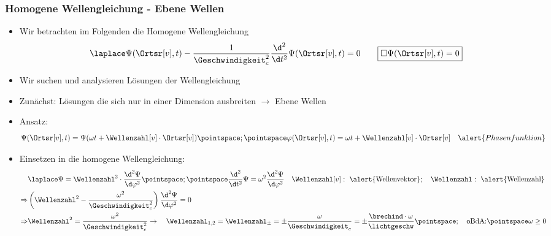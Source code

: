 \begin{frame}
  \frametitle{Homogene Wellengleichung - Ebene Wellen}
  \begin{itemize}[<+->]
\item Wir betrachten im Folgenden die \alert{Homogene Wellengleichung}
    \begin{equation*}
\laplace\Psi (\Ortsr[v], t) - \frac{1}{\Geschwindigkeit_{c}^2}\frac{\d ^2}{\d t^2}\Psi (\Ortsr[v], t) = 0 \qquad \boxed{\square \Psi (\Ortsr[v], t) = 0} 
\end{equation*}
\item Wir suchen und analysieren Lösungen der Wellengleichung
\item Zunächst: Lösungen die sich nur in \alert{einer Dimension ausbreiten} \(\to\) \alert{Ebene Wellen}
\item Ansatz:
  \begin{equation*}
    \Psi(\Ortsr[v], t) = \Psi (\omega t + \Wellenzahl[v]\cdot\Ortsr[v]) \pointspace ; \pointspace \varphi (\Ortsr[v], t) = \omega t + \Wellenzahl[v]\cdot\Ortsr[v] \quad \alert{Phasenfunktion} 
  \end{equation*}
\item Einsetzen in die homogene Wellengleichung:
  \begin{align*}
& \laplace\Psi = \Wellenzahl^2\cdot\frac{\d^2 \Psi}{\d \varphi^2}\pointspace ; \pointspace \frac{\d^2}{\d t^2}\Psi = \omega^2\frac{\d^2 \Psi}{\d \varphi^2}\quad\Wellenzahl[v]:\text{ \alert{Wellenvektor}};\quad\Wellenzahl:\text{ \alert{Wellenzahl}}\\
\Rightarrow &\left( \Wellenzahl^2 -\frac{\omega^2}{\Geschwindigkeit_{c}^2}\right)\frac{\d^2 \Psi}{\d \varphi^2} = 0\\
\Rightarrow & \Wellenzahl^2 = \frac{\omega^2}{\Geschwindigkeit_{c}^2} \to \quad\Wellenzahl_{1,2}=\Wellenzahl_\pm=\pm\frac{\omega}{\Geschwindigkeit_{c}}=\pm \frac{\brechind\cdot \omega}{\lichtgeschw}\pointspace;\quad \text{oBdA:}\pointspace \omega\geq 0
\end{align*}
  \end{itemize}
\end{frame}


